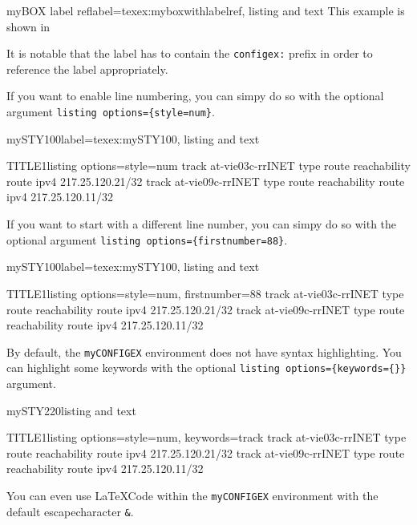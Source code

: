 \documentclass[]{myHOWTO-V001}
\begin{document}
\begin{myTEXEXdoclst}{myBOX label ref}{label={texex:myboxwithlabelref}, listing and text}
This example is shown in 
\end{myTEXEXdoclst}

It is notable that the label has to contain the \Verb|configex:| prefix in order to reference the label appropriately.

If you want to enable line numbering, you can simpy do so with the optional argument \verb|listing options={style=num}|.

\begin{myTEXEXdoclst}{mySTY100}{label={texex:mySTY100}, listing and text}
\begin{myCONFIGEXlst}{TITLE1}{listing options={style=num}}
track at-vie03c-rrINET type route reachability route ipv4 217.25.120.21/32
track at-vie09c-rrINET type route reachability route ipv4 217.25.120.11/32
\end{myCONFIGEXlst}
\end{myTEXEXdoclst}

If you want to start with a different line number, you can simpy do so with the optional argument \verb|listing options={firstnumber=88}|.

\begin{myTEXEXdoclst}{mySTY100}{label={texex:mySTY100}, listing and text}
\begin{myCONFIGEXlst}{TITLE1}{listing options={style=num, firstnumber=88}}
track at-vie03c-rrINET type route reachability route ipv4 217.25.120.21/32
track at-vie09c-rrINET type route reachability route ipv4 217.25.120.11/32
\end{myCONFIGEXlst}
\end{myTEXEXdoclst}

By default, the \Verb|myCONFIGEX| environment does not have syntax highlighting. You can highlight some keywords with the optional \verb|listing options={keywords={}}| argument.

\begin{myTEXEXdoclst}{mySTY220}{listing and text}
\begin{myCONFIGEXlst}{TITLE1}{listing options={style=num, keywords={track}}}
track at-vie03c-rrINET type route reachability route ipv4 217.25.120.21/32
track at-vie09c-rrINET type route reachability route ipv4 217.25.120.11/32
\end{myCONFIGEXlst}
\end{myTEXEXdoclst}

You can even use \LaTeX Code within the \Verb|myCONFIGEX| environment with the default escapecharacter \Verb|&|.
\end{document}
